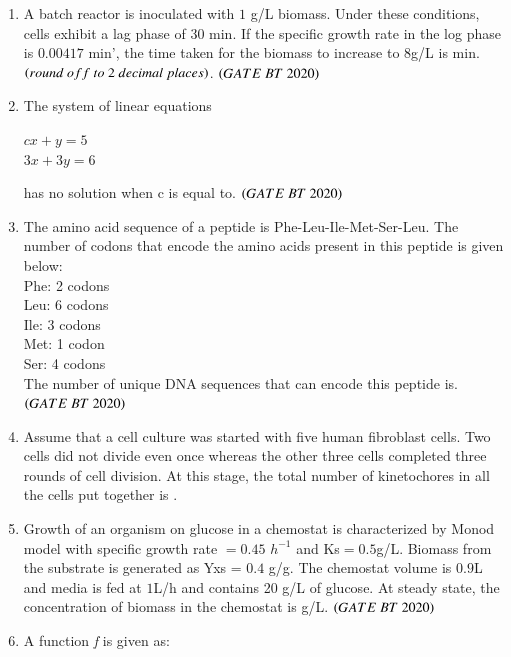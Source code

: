 \documentclass[journal,12pt,onecolumn]{IEEEtran}
\theoremstyle{remark}
\begin{document}
\begin{enumerate}[label=Q\arabic*:]
\begin{enumerate}[label=Q\arabic*:, start=26, leftmargin=2em]
\item A batch reactor is inoculated with $1$ g/L biomass. Under these conditions, cells exhibit a lag phase of $30$ min. If the specific growth rate in the log phase is $0.00417$ min', the time taken for the biomass to increase to $ 8 $g/L is min.\\
$\brak{round \ off \ to \ 2 \ decimal\ places}$. \hfill$\brak{GATE\ BT\ 2020}$

\item The system of linear equations\\
\begin{center}
$cx+y=5$\\
$3x+3y=6$\\
\end{center}
has no solution when c is equal to. \hfill$\brak{GATE\ BT\ 2020}$

\item The amino acid sequence of a peptide is Phe-Leu-Ile-Met-Ser-Leu. The number of codons that encode the amino acids present in this peptide is given below:\\
Phe: 2 codons\\
Leu: 6 codons\\
Ile: 3 codons\\
Met: 1 codon\\
Ser: 4 codons\\

The number of unique DNA sequences that can encode this peptide is. \hfill$\brak{GATE\ BT\ 2020}$\\


\item Assume that a cell culture was started with five human fibroblast cells. Two cells did not divide even once whereas the other three cells completed three rounds of cell division. At this stage, the total number of kinetochores in all the cells put together is . \hfill\brak{[GATE 2020-BT]}\\

\item Growth of an organism on glucose in a chemostat is characterized by Monod model with specific growth rate $= 0.45$ $h^{-1}$ and Ks$ = 0.5 $g/L. Biomass from the substrate is generated as Yxs = $0.4$ g/g. The chemostat volume is $0.9 $L and media is fed at $1 $L/h and contains 20 g/L of glucose. At steady state, the concentration of biomass in the chemostat is g/L. \hfill$\brak{GATE\ BT\ 2020}$\\

\item A function \textit{f} is given as:\\


\end{enumerate}
\end{enumerate}
\end{document}
